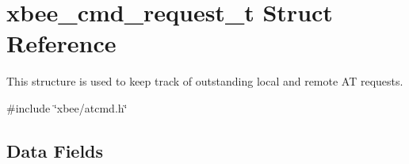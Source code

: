 \hypertarget{structxbee__cmd__request__t}{\section{xbee\-\_\-cmd\-\_\-request\-\_\-t Struct Reference}
\label{structxbee__cmd__request__t}
}


This structure is used to keep track of outstanding local and remote A\-T requests.  




{\ttfamily \#include \char`\"{}xbee/atcmd.\-h\char`\"{}}

\subsection*{Data Fields}

